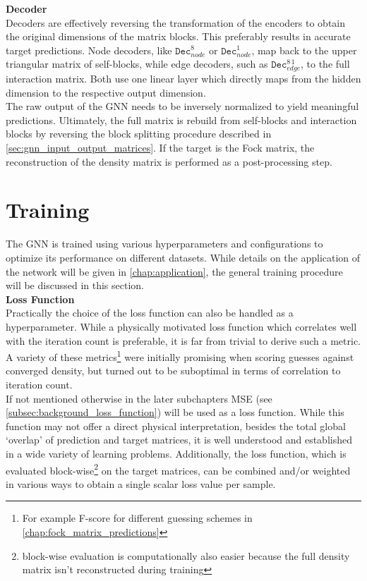 \textbf{Decoder}\\
Decoders are effectively reversing the transformation of the encoders to obtain the original dimensions of the matrix blocks. This preferably results in accurate target predictions. Node decoders, like $\texttt{Dec}^{8}_{node}$ or  $\texttt{Dec}^{1}_{node}$, map back to the upper triangular matrix of self-blocks, while edge decoders, such as $\texttt{Dec}^{8\,1}_{edge}$, to the full interaction matrix. Both use one linear layer which directly maps from the hidden dimension to the respective output dimension. \\

The raw output of the GNN needs to be inversely normalized to yield meaningful predictions. Ultimately, the full matrix is rebuild from self-blocks and interaction blocks by reversing the block splitting procedure described in \autoref{sec:gnn_input_output_matrices}. If the target is the Fock matrix, the reconstruction of the density matrix is performed as a post-processing step.

\section{Training}
\label{sec:gnn_training}

The GNN is trained using various hyperparameters and configurations to optimize its performance on different datasets. While details on the application of the network will be given in \autoref{chap:application}, the general training procedure will be discussed in this section. \\

\textbf{Loss Function}\\
Practically the choice of the loss function can also be handled as a hyperparameter. While a physically motivated loss function which correlates well with the iteration count is preferable, it is far from trivial to derive such a metric. A variety of these metrics\footnote{For example F-score for different guessing schemes in \autoref{chap:fock_matrix_predictions}} were initially promising when scoring guesses against converged density, but turned out to be suboptimal in terms of correlation to iteration count. \\
If not mentioned otherwise in the later subchapters MSE (see \autoref{subsec:background_loss_function}) will be used as a loss function. While this function may not offer a direct physical interpretation, besides the total global `overlap' of prediction and target matrices, it is well understood and established in a wide variety of learning problems. Additionally, the loss function, which is evaluated block-wise\footnote{block-wise evaluation is computationally also easier because the full density matrix isn't reconstructed during training} on the target matrices, can be combined and/or weighted in various ways to obtain a single scalar loss value per sample. 

